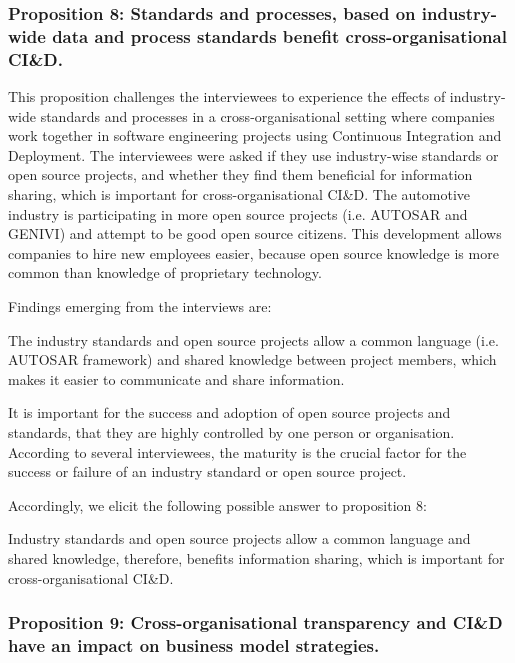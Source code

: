 \subsubsection{Proposition 8: Standards and processes, based on industry-wide data and process standards benefit cross-organisational CI\&D.}

This proposition challenges the interviewees to experience the effects of industry-wide standards and processes in a cross-organisational setting where companies work together in software engineering projects using Continuous Integration and Deployment. The interviewees were asked if they use industry-wise standards or open source projects, and whether they find them beneficial for information sharing, which is important for cross-organisational CI\&D. The automotive industry is participating in more open source projects (i.e. AUTOSAR and GENIVI) and attempt to be good open source citizens. This development allows companies to hire new employees easier, because open source knowledge is more common than knowledge of proprietary technology.

Findings emerging from the interviews are:

{} The industry standards and open source projects allow a common language (i.e. AUTOSAR framework) and shared knowledge between project members, which makes it easier to communicate and share information.

 It is important for the success and adoption of open source projects and standards, that they are highly controlled by one person or organisation. According to several interviewees, the maturity is the crucial factor for the success or failure of an industry standard or open source project.

Accordingly, we elicit the following possible answer to proposition 8:

Industry standards and open source projects allow a common language and shared knowledge, therefore, benefits information sharing, which is important for cross-organisational CI\&D.

\subsubsection{Proposition 9: Cross-organisational transparency and CI\&D have an impact on business model strategies.}


